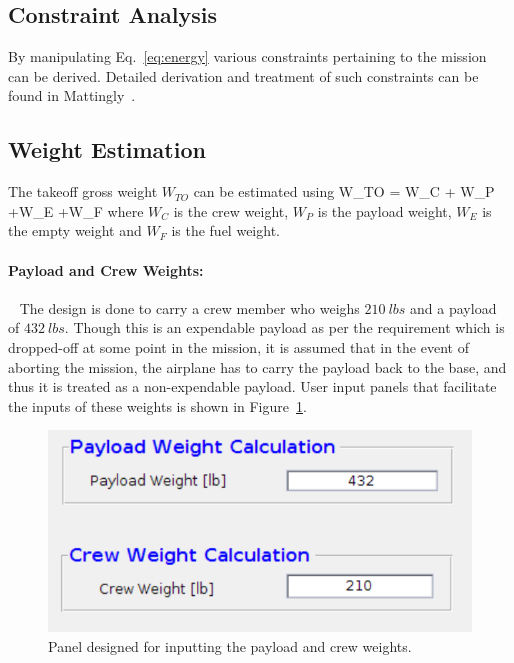 \documentclass[pdftex,11pt,letter]{article}
\begin{document}
\subsection{Constraint Analysis}
By manipulating Eq.~\ref{eq:energy} various constraints pertaining to the mission can be derived. Detailed derivation and treatment of such constraints can be found in Mattingly~\etal\cite{MattinglyText}.

\subsection{Weight Estimation}

The  takeoff gross weight $W_{TO}$ can be estimated using
\beq\label{eq:takeoff_weight}
W_{TO} = W_C + W_P +W_E +W_F
\eeq
where $W_C$ is the crew weight, $W_P$ is the payload weight, $W_E$ is the empty weight and $W_F$ is the fuel weight.
\paragraph{Payload and Crew Weights:}~ The design is done to carry a crew member who weighs $210~lbs$ and  a payload of $432~lbs$. Though this is an expendable payload as per the requirement which is dropped-off at some point in the mission, it is assumed that in the event of aborting the mission, the airplane has to carry the payload back to the base, and thus it is treated as a non-expendable payload. User input panels that facilitate the inputs of these weights is shown  in Figure~\ref{payload_crew_weight_panel}.
\begin{figure}[h!]
	\centering
	\includegraphics[scale=0.85]{figures/payload_crew_weight_panel.pdf}
	\caption{Panel designed for inputting the payload and crew weights.}
	\label{payload_crew_weight_panel}
\end{figure}
\end{document}
